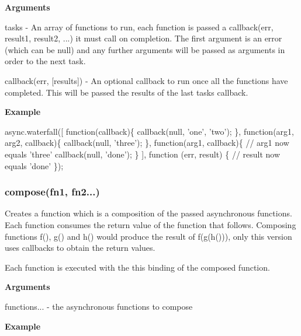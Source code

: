 {\bfseries Arguments}


\begin{DoxyItemize}
\item tasks -\/ An array of functions to run, each function is passed a callback(err, result1, result2, ...) it must call on completion. The first argument is an error (which can be null) and any further arguments will be passed as arguments in order to the next task.
\item callback(err, \mbox{[}results\mbox{]}) -\/ An optional callback to run once all the functions have completed. This will be passed the results of the last task\textquotesingle{}s callback.
\end{DoxyItemize}

{\bfseries Example}


\begin{DoxyCode}
async.waterfall([
    \textcolor{keyword}{function}(callback)\{
        callback(null, \textcolor{stringliteral}{'one'}, \textcolor{stringliteral}{'two'});
    \},
    \textcolor{keyword}{function}(arg1, arg2, callback)\{
        callback(null, \textcolor{stringliteral}{'three'});
    \},
    \textcolor{keyword}{function}(arg1, callback)\{
        \textcolor{comment}{// arg1 now equals 'three'}
        callback(null, \textcolor{stringliteral}{'done'});
    \}
], \textcolor{keyword}{function} (err, result) \{
   \textcolor{comment}{// result now equals 'done'    }
\});
\end{DoxyCode}
 

 \label{_compose}%
 \subsubsection*{compose(fn1, fn2...)}

Creates a function which is a composition of the passed asynchronous functions. Each function consumes the return value of the function that follows. Composing functions f(), g() and h() would produce the result of f(g(h())), only this version uses callbacks to obtain the return values.

Each function is executed with the {\ttfamily this} binding of the composed function.

{\bfseries Arguments}


\begin{DoxyItemize}
\item functions... -\/ the asynchronous functions to compose
\end{DoxyItemize}

{\bfseries Example}


